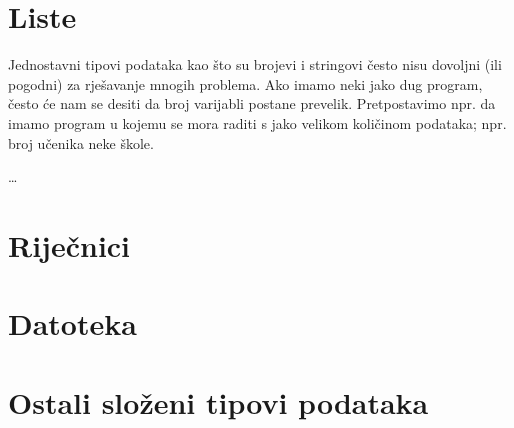\section{Liste}

Jednostavni tipovi podataka kao \v{s}to su brojevi i stringovi
\v{c}esto nisu dovoljni (ili pogodni) za rje\v{s}avanje mnogih
problema. Ako imamo neki jako dug program, \v{c}esto \'{c}e nam se
desiti da broj varijabli postane prevelik. Pretpostavimo npr. da
imamo program u kojemu se mora raditi s jako velikom koli\v{c}inom
podataka; npr. broj u\v{c}enika neke \v{s}kole.

\dots

\section{Rije\v cnici}

\section{Datoteka}

\section{Ostali slo\v zeni tipovi podataka}
